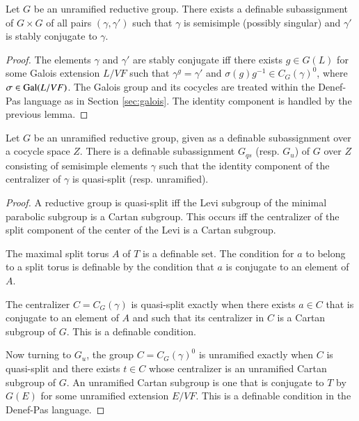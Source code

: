 \begin{lemma} 
  Let $G$ be an unramified reductive group.  There exists a definable
  subassignment of $G\times G$ of all pairs $(\gamma,\gamma')$ such
  that $\gamma$ is semisimple (possibly singular) and $\gamma'$ is
  stably conjugate to $\gamma$.
\end{lemma}

\begin{proof} The elements $\gamma$ and $\gamma'$ are stably conjugate
  iff there exists $g\in G(L)$ for some Galois extension $L/VF$ such
  that $\gamma^g = \gamma'$ and $\sigma(g)g^{-1} \in C_G(\gamma)^0$,
  where $\sigma\in {\operatorname{Gal}}(L/VF)$.  The Galois group and its cocycles
  are treated within the Denef-Pas language as in Section
  \ref{sec:galois}.  The identity component is handled by the previous
  lemma.
\end{proof}

\begin{lemma} 
  Let $G$ be an unramified reductive group, given as a definable
  subassignment over a cocycle space $Z$.  There is a definable
  subassignment $G_{qs}$ (resp. $G_u$) of $G$ over $Z$ consisting of 
  semisimple elements $\gamma$ such that the identity component of
  the centralizer of $\gamma$ is quasi-split (resp. unramified).
\end{lemma}

\begin{proof} 
  A reductive group is quasi-split iff the Levi subgroup of the
  minimal parabolic subgroup is a Cartan subgroup.  This occurs iff
  the centralizer of the split component of the center of the Levi is
  a Cartan subgroup.

  The maximal split torus $A$ of $T$ is a definable set.  The
  condition for $a$ to belong to a split torus is definable by the
  condition that $a$ is conjugate to an element of $A$.

  The centralizer $C=C_G(\gamma)$ is quasi-split exactly when there
  exists $a\in C$ that is conjugate to an element of $A$ and such that
  its centralizer in $C$ is a Cartan subgroup of $G$.  This is a
  definable condition.

  Now turning to $G_u$, the group $C=C_G(\gamma)^0$ is unramified
  exactly when $C$ is quasi-split and there exists $t\in C$ whose
  centralizer is an unramified Cartan subgroup of $G$.  An unramified
  Cartan subgroup is one that is conjugate to $T$ by $G(E)$ for some
  unramified extension $E/VF$.  This is a definable condition in the
  Denef-Pas language.
\end{proof}


